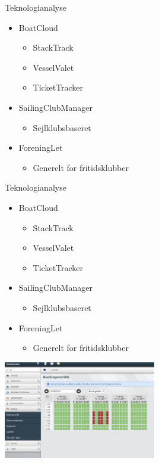 \begin{frame}{Teknologianalyse}
  \begin{itemize}
    \item BoatCloud
    \begin{itemize}
      \item StackTrack
      \item VesselValet
      \item TicketTracker
    \end{itemize}
    \item SailingClubManager
    \begin{itemize}
      \item Sejlklubsbaseret
    \end{itemize}
    \item ForeningLet
    \begin{itemize}
      \item Generelt for fritidsklubber
    \end{itemize}
  \end{itemize}

\end{frame}

\begin{frame}{Teknologianalyse}
  \begin{itemize}
    \item BoatCloud
    \begin{itemize}
      \item StackTrack
      \item VesselValet
      \item TicketTracker
    \end{itemize}
    \item SailingClubManager
    \begin{itemize}
      \item Sejlklubsbaseret
    \end{itemize}
    \item ForeningLet
    \begin{itemize}
      \item Generelt for fritidsklubber
    \end{itemize}
  \end{itemize}
  \includegraphics[width=0.5\textwidth]{images/ForeningLet.jpg}
\end{frame}


